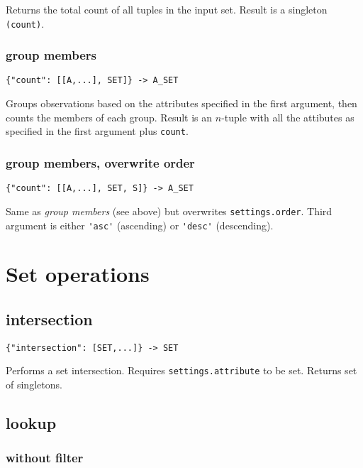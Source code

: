 \documentclass[a4paper]{article}
\begin{document}
Returns the total count of all tuples in the input set. Result is a
singleton \verb|(count)|.

\subsubsection{group members}

\begin{verbatim}
{"count": [[A,...], SET]} -> A_SET
\end{verbatim}

Groups observations based on the attributes specified in the first
argument, then counts the members of each group.  Result is an
$n$-tuple with all the attibutes as specified in the first argument
plus \verb|count|.

\subsubsection{group members, overwrite order}

\begin{verbatim}
{"count": [[A,...], SET, S]} -> A_SET
\end{verbatim}

Same as \textit{group members} (see above) but overwrites \verb|settings.order|. Third argument is either \verb|'asc'| (ascending)
or \verb|'desc'| (descending).

\section{Set operations}

\subsection{intersection}

\begin{verbatim}
{"intersection": [SET,...]} -> SET
\end{verbatim}

Performs a set intersection. Requires \verb|settings.attribute| to be
set. Returns set of singletons.

\subsection{lookup}

\subsubsection{without filter}
\end{document}
